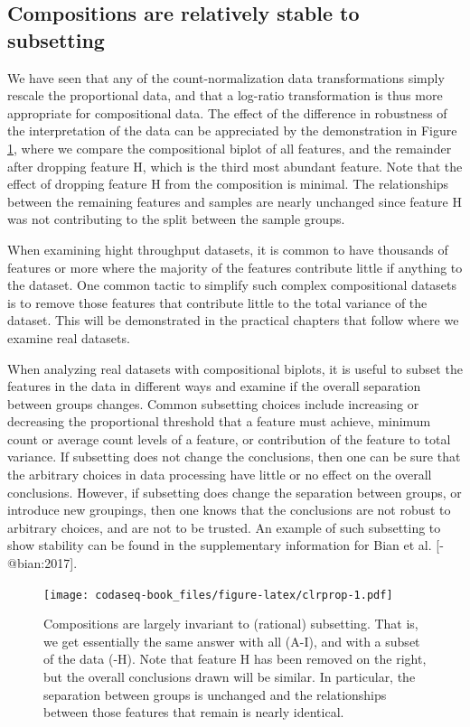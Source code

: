 \documentclass[
  onecolumn]{article}
\begin{document}
\hypertarget{compositions-are-relatively-stable-to-subsetting}{%
\subsection{Compositions are relatively stable to subsetting}\label{compositions-are-relatively-stable-to-subsetting}}

We have seen that any of the count-normalization data transformations simply rescale the proportional data, and that a log-ratio transformation is thus more appropriate for compositional data. The effect of the difference in robustness of the interpretation of the data can be appreciated by the demonstration in Figure \ref{fig:clrprop}, where we compare the compositional biplot of all features, and the remainder after dropping feature H, which is the third most abundant feature. Note that the effect of dropping feature H from the composition is minimal. The relationships between the remaining features and samples are nearly unchanged since feature H was not contributing to the split between the sample groups.

When examining hight throughput datasets, it is common to have thousands of features or more where the majority of the features contribute little if anything to the dataset. One common tactic to simplify such complex compositional datasets is to remove those features that contribute little to the total variance of the dataset. This will be demonstrated in the practical chapters that follow where we examine real datasets.

When analyzing real datasets with compositional biplots, it is useful to subset the features in the data in different ways and examine if the overall separation between groups changes. Common subsetting choices include increasing or decreasing the proportional threshold that a feature must achieve, minimum count or average count levels of a feature, or contribution of the feature to total variance. If subsetting does not change the conclusions, then one can be sure that the arbitrary choices in data processing have little or no effect on the overall conclusions. However, if subsetting does change the separation between groups, or introduce new groupings, then one knows that the conclusions are not robust to arbitrary choices, and are not to be trusted. An example of such subsetting to show stability can be found in the supplementary information for Bian et al. {[}-@bian:2017{]}.

\begin{figure}
\centering
\texttt{[image: codaseq-book\_files/figure-latex/clrprop-1.pdf]}
\caption{\label{fig:clrprop}Compositions are largely invariant to (rational) subsetting. That is, we get essentially the same answer with all (A-I), and with a subset of the data (-H). Note that feature H has been removed on the right, but the overall conclusions drawn will be similar. In particular, the separation between groups is unchanged and the relationships between those features that remain is nearly identical.}
\end{figure}
\end{document}
